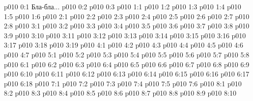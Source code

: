 \author{Всеобщий Цензор}
\vs p010 0:1  Бла-бла...
\vs p010 0:2 
\vs p010 0:3 \pc 
{}
\vs p010 1:1 
\vs p010 1:2 
\vs p010 1:3 \pc 
\vs p010 1:4 \pc 
\vs p010 1:5 
\vs p010 1:6 
\vs p010 2:1 
\vs p010 2:2 
\vs p010 2:3 
\vs p010 2:4 \pc 
\vs p010 2:5 \pc 
\vs p010 2:6 \pc 
\vs p010 2:7 \pc 
\vs p010 2:8 
\vs p010 3:1 
\vs p010 3:2 \pc 
\vs p010 3:3 
\vs p010 3:4 
\vs p010 3:5 \pc 
\vs p010 3:6 
\vs p010 3:7 
\vs p010 3:8 
\vs p010 3:9 \pc 
\vs p010 3:10 
\vs p010 3:11 
\vs p010 3:12 
\vs p010 3:13 
\vs p010 3:14 
\vs p010 3:15 
\vs p010 3:16 
\vs p010 3:17 \pc 
\vs p010 3:18 \pc 
\vs p010 3:19 \pc 
{}
\vs p010 4:1 
\vs p010 4:2 \pc 
\vs p010 4:3 
\vs p010 4:4 
\vs p010 4:5 \pc 
\vs p010 4:6 \pc 
\vs p010 4:7 
\vs p010 5:1 
\vs p010 5:2 
\vs p010 5:3 \pc 
\vs p010 5:4 
\vs p010 5:5 
\vs p010 5:6 
\vs p010 5:7 \pc 
\vs p010 5:8 \pc 
{}
\vs p010 6:1 
\vs p010 6:2 \pc 
\vs p010 6:3 \pc 
\vs p010 6:4 \pc 
\vs p010 6:5 \pc 
\vs p010 6:6 
\vs p010 6:7 
\vs p010 6:8 
\vs p010 6:9 
\vs p010 6:10 
\vs p010 6:11 
\vs p010 6:12 
\vs p010 6:13 
\vs p010 6:14 
\vs p010 6:15 
\vs p010 6:16 \pc 
\vs p010 6:17 
\vs p010 6:18 
\vs p010 7:1 
\vs p010 7:2 \pc 
\vs p010 7:3 
\vs p010 7:4 \pc 
\vs p010 7:5 
\vs p010 7:6 
\vs p010 8:1 
\vs p010 8:2 
\vs p010 8:3 \pc 
\vs p010 8:4 
\vs p010 8:5 
\vs p010 8:6 \pc 
\vs p010 8:7 
\vs p010 8:8 
\vs p010 8:9 \pc 
\vsetoff
\vs p010 8:10 
\quizlink
